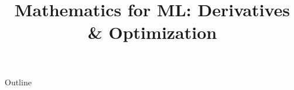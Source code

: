 \documentclass[xcolor=dvipsnames,compress,t,pdf,9pt]{beamer}
\title[\insertframenumber /\inserttotalframenumber]{Mathematics for ML: Derivatives \& Optimization}
\begin{document}
	\begin{frame}
	\titlepage
	\end{frame}

	\begin{frame}{Outline}
	    \tableofcontents
	\end{frame}

	
	
	
	
\end{document}
